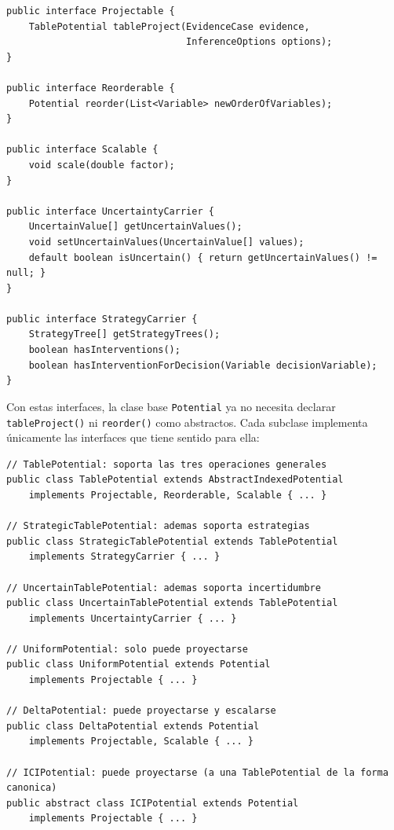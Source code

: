 \documentclass[11pt,a4paper]{article}
\newcommand{\code}[1]{\texttt{#1}}
\begin{document}
\begin{lstlisting}[caption={Definición de las interfaces de capacidad (Opción~3)}]
public interface Projectable {
    TablePotential tableProject(EvidenceCase evidence,
                                InferenceOptions options);
}

public interface Reorderable {
    Potential reorder(List<Variable> newOrderOfVariables);
}

public interface Scalable {
    void scale(double factor);
}

public interface UncertaintyCarrier {
    UncertainValue[] getUncertainValues();
    void setUncertainValues(UncertainValue[] values);
    default boolean isUncertain() { return getUncertainValues() != null; }
}

public interface StrategyCarrier {
    StrategyTree[] getStrategyTrees();
    boolean hasInterventions();
    boolean hasInterventionForDecision(Variable decisionVariable);
}
\end{lstlisting}

Con estas interfaces, la clase base \code{Potential} ya no necesita declarar
\code{tableProject()} ni \code{reorder()} como abstractos.  Cada subclase
implementa únicamente las interfaces que tiene sentido para ella:

\begin{lstlisting}[caption={Declaraciones de clases en la Opción~3}]
// TablePotential: soporta las tres operaciones generales
public class TablePotential extends AbstractIndexedPotential
    implements Projectable, Reorderable, Scalable { ... }

// StrategicTablePotential: ademas soporta estrategias
public class StrategicTablePotential extends TablePotential
    implements StrategyCarrier { ... }

// UncertainTablePotential: ademas soporta incertidumbre
public class UncertainTablePotential extends TablePotential
    implements UncertaintyCarrier { ... }

// UniformPotential: solo puede proyectarse
public class UniformPotential extends Potential
    implements Projectable { ... }

// DeltaPotential: puede proyectarse y escalarse
public class DeltaPotential extends Potential
    implements Projectable, Scalable { ... }

// ICIPotential: puede proyectarse (a una TablePotential de la forma canonica)
public abstract class ICIPotential extends Potential
    implements Projectable { ... }
\end{lstlisting}
\end{document}
